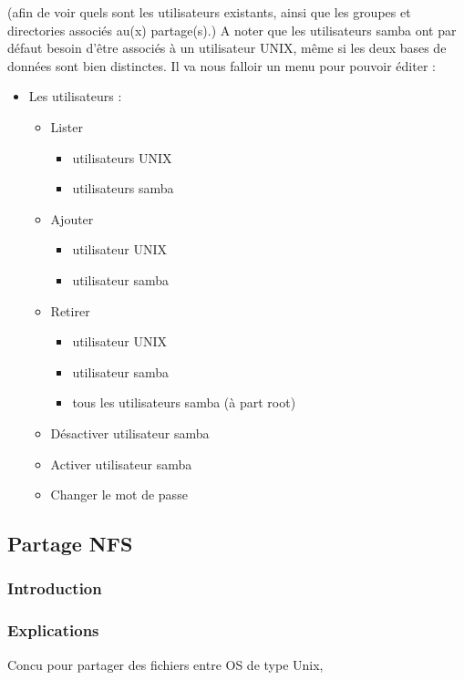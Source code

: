 \documentclass{article}
\begin{document}
	(afin de voir quels sont les utilisateurs existants, ainsi que les groupes et directories associés au(x) partage(s).)
	A noter que les utilisateurs samba ont par défaut besoin d'être associés à un utilisateur UNIX, même si les deux bases de données sont bien distinctes.
	Il va nous falloir un menu pour pouvoir éditer :
	\begin{itemize}
		\item Les utilisateurs :
		\begin{itemize}
			\item[\checkmark] Lister  
			\begin{itemize}
				\item[\checkmark] utilisateurs UNIX
				\item[\checkmark] utilisateurs samba
			\end{itemize}
			\item[\checkmark] Ajouter 
			\begin{itemize}
					\item[\checkmark] utilisateur UNIX
				\item[\checkmark] utilisateur samba 
			\end{itemize}
			\item Retirer
						\begin{itemize}
				\item utilisateur UNIX
				\item[\checkmark] utilisateur samba 
				\item [\checkmark] tous les utilisateurs samba (à part root)
			\end{itemize}
			\item Désactiver utilisateur samba
			\item Activer utilisateur samba
			\item Changer le mot de passe
		\end{itemize}	
	\end{itemize}

	\subsection{Partage NFS}
	\subsubsection{Introduction}

	\subsubsection{Explications}
	Concu pour partager des fichiers entre OS de type Unix, 
	
\end{document}

